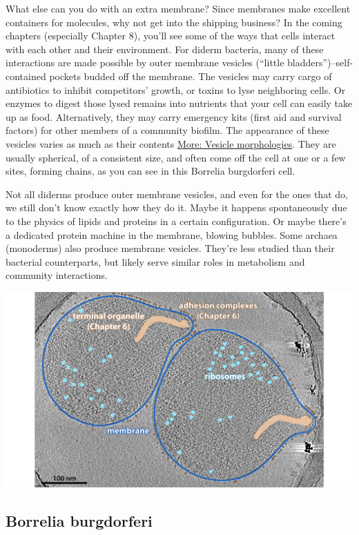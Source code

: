 \documentclass[]{tufte-book}
\begin{document}
What else can you do with an extra membrane? Since membranes make
excellent containers for molecules, why not get into the shipping
business? In the coming chapters (especially Chapter 8), you'll see some
of the ways that cells interact with each other and their environment.
For diderm bacteria, many of these interactions are made possible by
outer membrane vesicles (``little bladders'')--self-contained pockets
budded off the membrane. The vesicles may carry cargo of antibiotics to
inhibit competitors' growth, or toxins to lyse neighboring cells. Or
enzymes to digest those lysed remains into nutrients that your cell can
easily take up as food. Alternatively, they may carry emergency kits
(first aid and survival factors) for other members of a community
biofilm. The appearance of these vesicles varies as much as their
contents \protect\hyperlink{Vesicle_morphologies}{More: Vesicle
morphologies}. They are usually spherical, of a consistent size, and
often come off the cell at one or a few sites, forming chains, as you
can see in this Borrelia burgdorferi cell.

Not all diderms produce outer membrane vesicles, and even for the ones
that do, we still don't know exactly how they do it. Maybe it happens
spontaneously due to the physics of lipids and proteins in a certain
configuration. Or maybe there's a dedicated protein machine in the
membrane, blowing bubbles. Some archaea (monoderms) also produce
membrane vesicles. They're less studied than their bacterial
counterparts, but likely serve similar roles in metabolism and community
interactions.

\includegraphics{img/02_static/2_1_Mgenitalium}

\hypertarget{Vesicle_morphologies}{\subsection{Borrelia
burgdorferi}\label{Vesicle_morphologies}}
\end{document}
